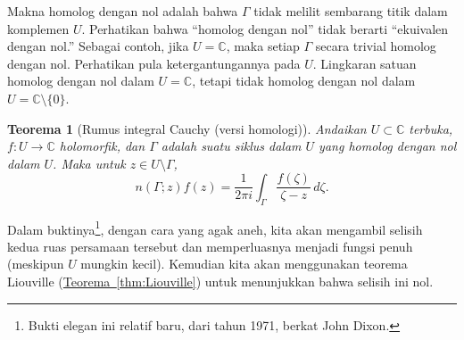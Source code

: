 \documentclass[12pt,openany]{book}
\newcommand{\C}{{\mathbb{C}}}
\newcommand{\myquote}[1]{``#1''}
\theoremstyle{plain}
\newtheorem{thm}{Teorema}[section]
\theoremstyle{remark}
\theoremstyle{definition}
\theoremstyle{exercise}
\theoremstyle{example}
\newcommand{\thmref}[1]{\hyperref[#1]{Teorema~\ref*{#1}}}
\begin{document}
Makna homolog dengan nol adalah bahwa $\Gamma$ tidak melilit sembarang
titik dalam komplemen $U$.
Perhatikan bahwa \myquote{homolog dengan nol} tidak berarti
\myquote{ekuivalen dengan nol.}
Sebagai contoh, jika $U = \C$, maka setiap $\Gamma$ secara trivial homolog dengan nol.
Perhatikan pula ketergantungannya pada $U$.  Lingkaran satuan homolog dengan nol dalam
$U = \C$, tetapi tidak homolog dengan nol dalam $U = \C \setminus \{ 0 \}$.

\begin{thm}[Rumus integral Cauchy (versi homologi)]
\label{thm:CIFhomology}
Andaikan $U \subset \C$ terbuka, $f \colon U \to \C$ holomorfik, dan
$\Gamma$ adalah
suatu siklus
dalam $U$
yang homolog dengan nol dalam $U$.
Maka untuk $z \in U \setminus \Gamma$,
\begin{equation*}
n(\Gamma;z)
f(z)
=
\frac{1}{2\pi i}
\int_{\Gamma}
\frac{f(\zeta)}{\zeta-z}
\,
d \zeta .
\end{equation*}
\end{thm}

Dalam buktinya\footnote{%
Bukti elegan ini relatif baru, dari tahun 1971, berkat John Dixon.},
dengan cara yang agak aneh, kita akan mengambil selisih kedua
ruas persamaan tersebut dan memperluasnya menjadi fungsi penuh
(meskipun $U$ mungkin kecil).  Kemudian kita akan menggunakan
teorema Liouville (\thmref{thm:Liouville}) untuk menunjukkan bahwa selisih ini
nol.
\end{document}
